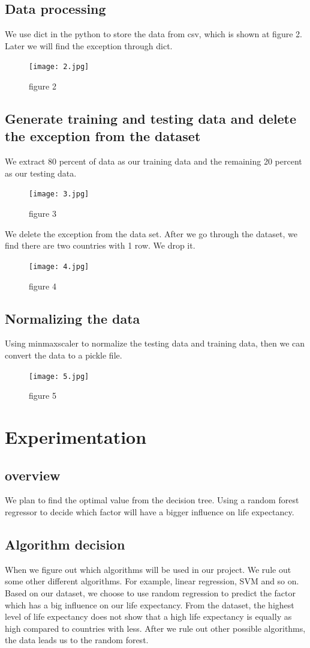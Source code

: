 \documentclass{article}
\begin{document}
\subsection{Data processing}
We use dict in the python to store the data from csv, which is shown at figure 2. 
Later we will find the exception through dict. 
\begin{figure}[H]
    \centering
    \texttt{[image: 2.jpg]}
    \caption{figure 2}
\end{figure}

\subsection{Generate training and testing data and delete the exception from the dataset}
We extract 80 percent of data as our training data and the remaining 20 percent as our testing data. 
\begin{figure}[H]
    \centering
    \texttt{[image: 3.jpg]}
    \caption{figure 3}
\end{figure}
We delete the exception from the data set. After we go through the dataset, we find there are two countries with 1 row. We drop it.
\begin{figure}[H]
    \centering
    \texttt{[image: 4.jpg]}
    \caption{figure 4}
\end{figure}

\subsection{Normalizing the data}
Using minmaxscaler to normalize the testing data and training data, then we can convert the data to a pickle file.
\begin{figure}[H]
    \centering
    \texttt{[image: 5.jpg]}
    \caption{figure 5}
\end{figure}


\section{Experimentation}
\subsection{overview}
We plan to find the optimal value from the decision tree. Using a random forest regressor to decide which factor will have a bigger influence on life expectancy. 
\subsection{Algorithm decision}
When we figure out which algorithms will be used in our project. We rule out some other different algorithms. For example, linear regression, SVM and so on. Based on our dataset, we choose to use random regression to predict the factor which has a big influence on our life expectancy. From the dataset, the highest level of life expectancy does not show that a high life expectancy is equally as high compared to countries with less. After we rule out other possible algorithms, the data leads us to the random forest. 
\end{document}
